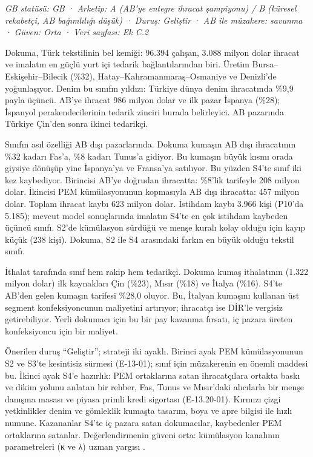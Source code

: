 \emph{GB statüsü: GB · Arketip: A (AB'ye entegre ihracat şampiyonu) / B (küresel rekabetçi, AB bağımlılığı düşük) · Duruş: Geliştir · AB ile müzakere: savunma · Güven: Orta · Veri sayfası: Ek C.2}

Dokuma, Türk tekstilinin bel kemiği: 96.394 çalışan, 3.088 milyon dolar ihracat ve imalatın en güçlü yurt içi tedarik bağlantılarından biri. Üretim Bursa--Eskişehir--Bilecik (\%32), Hatay--Kahramanmaraş--Osmaniye ve Denizli'de yoğunlaşıyor. Denim bu sınıfın yıldızı: Türkiye dünya denim ihracatında \%9,9 payla üçüncü. AB'ye ihracat 986 milyon dolar ve ilk pazar İspanya (\%28); İspanyol perakendecilerinin tedarik zinciri burada belirleyici. AB pazarında Türkiye Çin'den sonra ikinci tedarikçi.

Sınıfın asıl özelliği AB dışı pazarlarında. Dokuma kumaşın AB dışı ihracatının \%32 kadarı Fas'a, \%8 kadarı Tunus'a gidiyor. Bu kumaşın büyük kısmı orada giysiye dönüşüp yine İspanya'ya ve Fransa'ya satılıyor. Bu yüzden S4'te sınıf iki kez kaybediyor. Birincisi AB'ye doğrudan ihracatta: \%8'lik tarifeyle 208 milyon dolar. İkincisi PEM kümülasyonunun kopmasıyla AB dışı ihracatta: 457 milyon dolar. Toplam ihracat kaybı 623 milyon dolar. İstihdam kaybı 3.966 kişi (P10'da 5.185); mevcut model sonuçlarında imalatın S4'te en çok istihdam kaybeden üçüncü sınıfı. S2'de kümülasyon sürdüğü ve menşe kuralı kolay olduğu için kayıp küçük (238 kişi). Dokuma, S2 ile S4 arasındaki farkın en büyük olduğu tekstil sınıfı.

İthalat tarafında sınıf hem rakip hem tedarikçi. Dokuma kumaş ithalatının (1.322 milyon dolar) ilk kaynakları Çin (\%23), Mısır (\%18) ve İtalya (\%16). S4'te AB'den gelen kumaşın tarifesi \%28,0 oluyor. Bu, İtalyan kumaşını kullanan üst segment konfeksiyoncunun maliyetini artırıyor; ihracatçı ise DİR'le vergisiz getirebiliyor. Yerli dokumacı için bu bir pay kazanma fırsatı, iç pazara üreten konfeksiyoncu için bir maliyet.

Önerilen duruş ``Geliştir''; strateji iki ayaklı. Birinci ayak PEM kümülasyonunun S2 ve S3'te kesintisiz sürmesi (E-13-01); sınıf için müzakerenin en önemli maddesi bu. İkinci ayak S4'e hazırlık: PEM ortaklarına satan ihracatçılara ortakta baskı ve dikim yolunu anlatan bir rehber, Fas, Tunus ve Mısır'daki alıcılarla bir menşe danışma masası ve piyasa primli kredi sigortası (E-13.20-01). Kırmızı çizgi yetkinlikler denim ve gömleklik kumaşta tasarım, boya ve apre bilgisi ile hızlı numune. Kazananlar S4'te iç pazara satan dokumacılar, kaybedenler PEM ortaklarına satanlar. Değerlendirmenin güveni orta: kümülasyon kanalının parametreleri (κ ve λ) uzman yargısı \etiketH{}.

